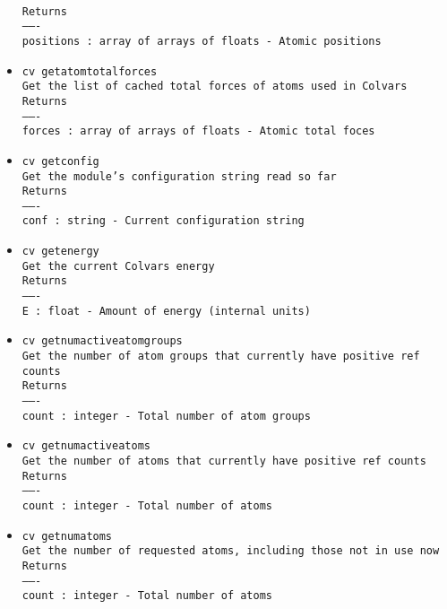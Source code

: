 \begin{itemize}
\\
\texttt{Returns}
\\
\texttt{-------}
\\
\texttt{positions : array of arrays of floats - Atomic positions}
\item \texttt{cv getatomtotalforces}
\\
\texttt{Get the list of cached total forces of atoms used in Colvars}
\\
\texttt{Returns}
\\
\texttt{-------}
\\
\texttt{forces : array of arrays of floats - Atomic total foces}
\item \texttt{cv getconfig}
\\
\texttt{Get the module's configuration string read so far}
\\
\texttt{Returns}
\\
\texttt{-------}
\\
\texttt{conf : string - Current configuration string}
\item \texttt{cv getenergy}
\\
\texttt{Get the current Colvars energy}
\\
\texttt{Returns}
\\
\texttt{-------}
\\
\texttt{E : float - Amount of energy (internal units)}
\item \texttt{cv getnumactiveatomgroups}
\\
\texttt{Get the number of atom groups that currently have positive ref counts}
\\
\texttt{Returns}
\\
\texttt{-------}
\\
\texttt{count : integer - Total number of atom groups}
\item \texttt{cv getnumactiveatoms}
\\
\texttt{Get the number of atoms that currently have positive ref counts}
\\
\texttt{Returns}
\\
\texttt{-------}
\\
\texttt{count : integer - Total number of atoms}
\item \texttt{cv getnumatoms}
\\
\texttt{Get the number of requested atoms, including those not in use now}
\\
\texttt{Returns}
\\
\texttt{-------}
\\
\texttt{count : integer - Total number of atoms}

\end{itemize}
